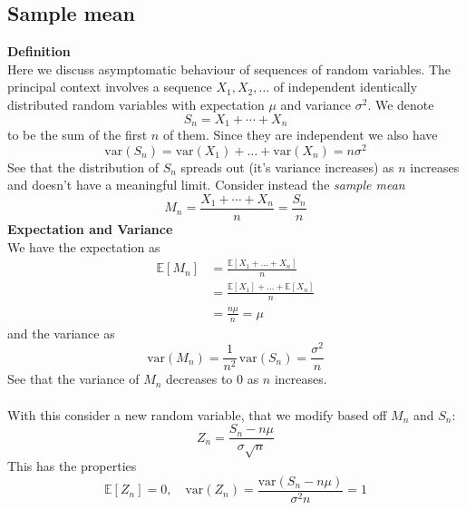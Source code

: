 \documentclass{report}
\begin{document}
\subsection{Sample mean}
\textbf{Definition}\\
Here we discuss asymptomatic behaviour of sequences of random variables. The principal context involves a sequence 
$X_1,X_2,\ldots$ of independent identically distributed random variables with expectation $\mu$ and variance 
$\sigma^2$.
We denote
\begin{equation*}
S_n=X_1+\cdots+X_n
\end{equation*}
to be the sum of the first $n$ of them. Since they are independent we also have
\begin{equation*}
\text{var}(S_n)=\text{var}(X_1)+\ldots+\text{var}(X_n)=n\sigma^2
\end{equation*}
See that the distribution of $S_n$ spreads out (it's variance increases) as $n$ increases and doesn't have a 
meaningful limit. Consider instead the \textit{sample mean}
\begin{equation*}
M_n=\frac{X_1+\cdots+X_n}{n}=\frac{S_n}{n}
\end{equation*}
\textbf{Expectation and Variance}\\
We have the expectation as
\begin{align*}
\mathbb{E}[M_n]&=\frac{\mathbb{E}[X_1+\ldots+X_n]}{n}\\
&=\frac{\mathbb{E}[X_1]+\ldots+\mathbb{E}[X_n]}{n}\\
&=\frac{n\mu}{n}=\mu
\end{align*}
and the variance as
\begin{equation*}
\text{var}(M_n)=\frac{1}{n^2}\,\text{var}(S_n)=\frac{\sigma^2}{n}
\end{equation*}
See that the variance of $M_n$ decreases to 0 as $n$ increases.\\
\vspace{1mm}\\
With this consider a new random variable, that we modify based off $M_n$ and $S_n$:
\begin{equation*}
Z_n=\frac{S_n-n\mu}{\sigma\sqrt{n}}
\end{equation*}
This has the properties
\begin{equation*}
\mathbb{E}[Z_n]=0,\quad\text{var}(Z_n)=\frac{\text{var}(S_n-n\mu)}{\sigma^2n}=1
\end{equation*}
\newpage
\end{document}
